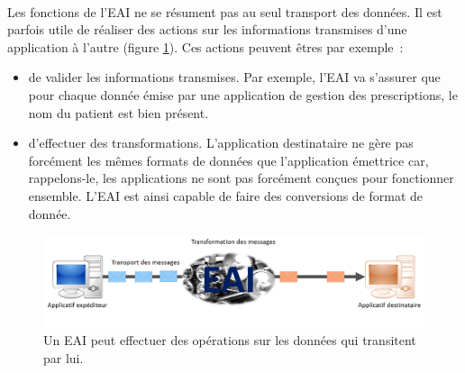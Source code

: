 			\paragraph{}%
			Les fonctions de l'EAI ne se résument pas au seul transport des données. Il
			est parfois utile de réaliser des actions sur les informations transmises
			d'une application à l'autre (figure \ref{interop_transfo}). Ces actions
			peuvent êtres par exemple~:\newline
			\begin{itemize}
			  \item de valider les informations transmises. Par exemple, l'EAI va
			  s'assurer que pour chaque donnée émise par une application de gestion des
			  prescriptions, le nom du patient est bien présent.
			  \item d'effectuer des transformations. L'application destinataire ne
			  gère pas forcément les mêmes formats de données que l'application émettrice
			  car, rappelons-le, les applications ne sont pas forcément conçues pour
			  fonctionner ensemble. L'EAI est ainsi capable de faire des conversions de
			  format de donnée.\newline
			\end{itemize}
			\begin{figure}[H]
				\centering
				\includegraphics[width=15cm]{../img/eai_2.png}
				\caption{\label{interop_transfo} Un EAI peut effectuer des opérations sur
				les données qui transitent par lui.}
			\end{figure}
			
